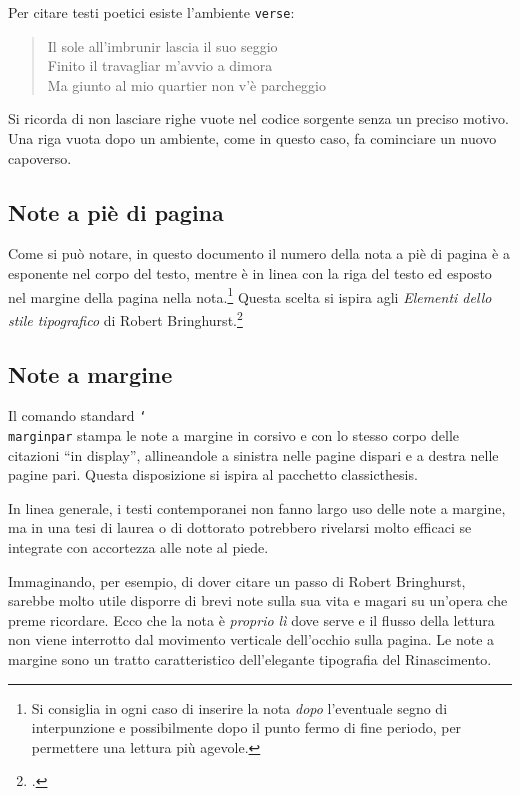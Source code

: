 \documentclass{suftesi}
\DeclareRobustCommand*{\cs}[1]{\texttt{\char`\\#1}}
\newcommand*{\env}[1]{\texttt{#1}}
\newcommand{\pack}{\textsf}
\begin{document}
Per citare testi poetici esiste l'ambiente \env{verse}:
\begin{verse}
Il sole all'imbrunir lascia il suo seggio\\
Finito il travagliar m'avvio a dimora\\
Ma giunto al mio quartier non v'è parcheggio
\end{verse}

Si ricorda di non lasciare righe vuote nel codice sorgente senza un
preciso motivo. Una riga vuota dopo un ambiente, come in questo caso,
fa cominciare un nuovo capoverso.

\subsection{Note a piè di pagina}

Come si può notare, in questo documento il numero della nota a piè di
pagina è a esponente nel corpo del testo, mentre è in linea con la riga del testo ed esposto nel margine della
pagina nella nota.\footnote{Si consiglia in ogni caso di inserire la nota \emph{dopo} l'eventuale segno di in\-ter\-pun\-zio\-ne e possibilmente
dopo il punto fermo di fine periodo, per permettere una lettura più agevole.} Questa scelta si ispira agli \emph{Elementi dello stile tipografico} di Robert Bringhurst.\footcite{Bringhurst:1996}

\subsection{Note a margine}

Il comando standard \cs{marginpar} stampa le note a margine in corsivo e con lo stesso corpo delle citazioni ``in display'', allineandole
a sinistra nelle pagine dispari e a destra nelle pagine pari. Questa
disposizione si ispira al pacchetto \pack{classicthesis}.

In linea generale, i testi contemporanei non fanno largo uso delle
note a margine, ma in una tesi di laurea o di dottorato potrebbero
rivelarsi molto efficaci se integrate con accortezza alle note al
piede.

Immaginando, per esempio, di dover citare un passo di Robert
Bringhurst, sarebbe molto utile disporre di brevi note sulla sua vita
e magari su un'opera che preme ricordare.  Ecco che la nota
è \emph{proprio lì} dove serve e il flusso della lettura non viene
interrotto dal movimento verticale dell'occhio sulla pagina. Le note a
margine sono un tratto caratteristico dell'elegante tipografia del
Rinascimento.
\end{document}
